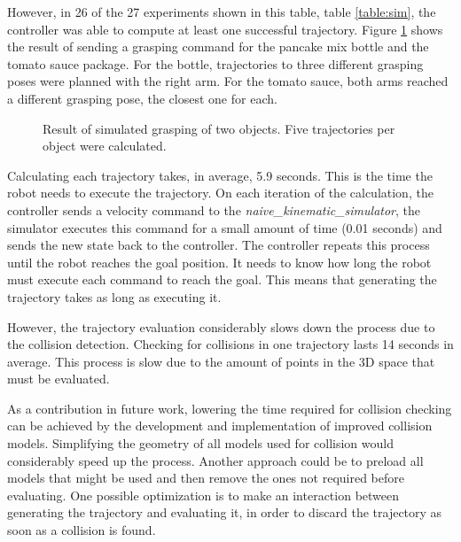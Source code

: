 However, in 26 of the 27 experiments shown in this table, table \ref{table:sim}, the controller was able to compute at least one successful trajectory. Figure \ref{fig:traj_sim} shows the result of sending a grasping command for the pancake mix bottle and the tomato sauce package. For the bottle, trajectories to three different grasping poses were planned with the right arm. For the tomato sauce, both arms reached a different grasping pose, the closest one for each.

\begin{figure}[H]
	\centering
	\begin{subfigure}[]
		{\texttt{[image: sim\_result.png]}}
	\end{subfigure}
	\begin{subfigure}[]
		{\texttt{[image: sim\_result2.png]}}
	\end{subfigure}
	\vspace{-10pt}
	\caption[Simulated Trajectories]{Result of simulated grasping of two objects. Five trajectories per object were calculated.}
	\vspace{-15pt}
	\label{fig:traj_sim}
\end{figure}

Calculating each trajectory takes, in average, 5.9 seconds. This is the time the robot needs to execute the trajectory. On each iteration of the calculation, the controller sends a velocity command to the \textit{naive\_kinematic\_simulator}, the simulator executes this command for a small amount of time (0.01 seconds) and sends the new state back to the controller. The controller repeats this process until the robot reaches the goal position. It needs to know how long the robot must execute each command to reach the goal. This means that generating the trajectory takes as long as executing it.

However, the trajectory evaluation considerably slows down the process due to the collision detection. Checking for collisions in one trajectory lasts 14 seconds in average. This process is slow due to the amount of points in the 3D space that must be evaluated.

As a contribution in future work, lowering the time required for collision checking can be achieved by the development and implementation of improved collision models. Simplifying the geometry of all models used for collision would considerably speed up the process. Another approach could be to preload all models that might be used and then remove the ones not required before evaluating. One possible optimization is to make an interaction between generating the trajectory and evaluating it, in order to discard the trajectory as soon as a collision is found.

